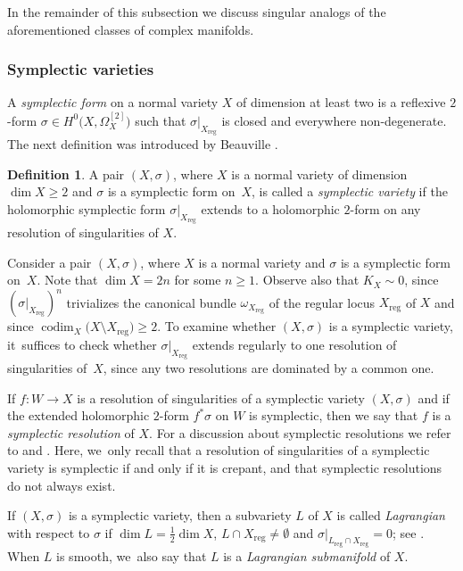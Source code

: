 \documentclass[10pt]{amsart}
\theoremstyle{plain}
\theoremstyle{definition}
\newtheorem{dfn}[thm]{Definition}
\DeclareMathOperator{\codim}{codim}
\begin{document}
In the remainder of this subsection we discuss singular analogs of the aforementioned classes of complex manifolds.

\subsubsection{Symplectic varieties}

A \emph{symplectic form} on a normal variety $X$ of dimension at least two is a reflexive $2$-form $\sigma \in H^0 \bigl(X, \Omega_X^{[2]} \bigr)$ such that $\sigma |_{X_\text{reg}}$ is closed and everywhere non-degenerate.
The next definition was introduced by Beauville \cite{Beauville00a}.

\begin{dfn}
\label{dfn:symplectic_variety}
A pair $(X,\sigma)$, where $X$ is a normal variety of dimension $\dim X \geq 2$ and $\sigma$ is a symplectic form on~$X$, is called a \emph{symplectic variety} if the holomorphic symplectic form $\sigma |_{X_\text{reg}}$ extends to a holomorphic $2$-form on any resolution of singularities of $X$.
\end{dfn}

Consider a pair $(X,\sigma)$, where $X$ is a normal variety and $\sigma$ is a symplectic form on~$X$. Note that $\dim X = 2n$ for some $n \geq 1$. Observe also that $K_X \sim 0$, since $(\sigma |_{X_\text{reg}})^n$ trivializes the canonical bundle $\omega_{X_\text{reg}}$ of the regular locus $X_\text{reg}$ of $X$ and since $\codim_X \bigl(X \setminus X_\text{reg} \bigr) \geq 2$.
To examine whether $(X,\sigma)$ is a symplectic variety, it~suffices to check whether $\sigma |_{X_\text{reg}}$ extends regularly to one resolution of singularities of~$X$, since any two resolutions are dominated by a common one.

If $f \colon W \to X$ is a resolution of singularities of a symplectic variety $(X,\sigma)$ and if the extended holomorphic $2$-form $f^* \sigma$ on $W$ is symplectic, then we say that $f$ is a \emph{symplectic resolution} of $X$. For a discussion about symplectic resolutions we refer to \cite{Fu06} and \cite[Rem.\,3.3(2) and Example 3.4(5)]{BL21}. Here, we~only recall that a resolution of singularities of a symplectic variety is symplectic if and only if it is crepant, and that symplectic resolutions do not always exist.

If $(X,\sigma)$ is a symplectic variety, then a subvariety $L$ of $X$ is called \emph{Lagrangian} with respect to $\sigma$ if $\dim L = \frac{1}{2} \dim X$, $L \cap X_{\text{reg}} \neq \emptyset$ and $\sigma |_{L_\text{reg} \cap X_{\text{reg}}} = 0$; see \cite[Lem.\,15]{Schwald20}. When $L$ is smooth, we~also say that $L$ is a \emph{Lagrangian submanifold} of $X$.
\end{document}
